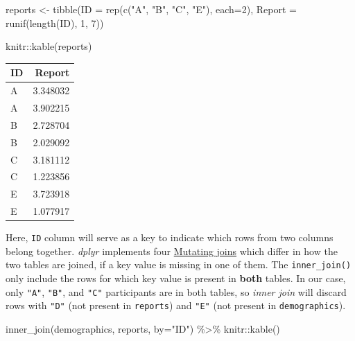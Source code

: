 \documentclass[
]{book}
\newenvironment{Shaded}{\begin{snugshade}}{\end{snugshade}}
\newcommand{\AttributeTok}[1]{\textcolor[rgb]{0.77,0.63,0.00}{#1}}
\newcommand{\DecValTok}[1]{\textcolor[rgb]{0.00,0.00,0.81}{#1}}
\newcommand{\FunctionTok}[1]{\textcolor[rgb]{0.00,0.00,0.00}{#1}}
\newcommand{\NormalTok}[1]{#1}
\newcommand{\OtherTok}[1]{\textcolor[rgb]{0.56,0.35,0.01}{#1}}
\newcommand{\SpecialCharTok}[1]{\textcolor[rgb]{0.00,0.00,0.00}{#1}}
\newcommand{\StringTok}[1]{\textcolor[rgb]{0.31,0.60,0.02}{#1}}
\begin{document}
\begin{Shaded}
\begin{Highlighting}[]
\NormalTok{reports }\OtherTok{\textless{}{-}} \FunctionTok{tibble}\NormalTok{(}\AttributeTok{ID =} \FunctionTok{rep}\NormalTok{(}\FunctionTok{c}\NormalTok{(}\StringTok{"A"}\NormalTok{, }\StringTok{"B"}\NormalTok{, }\StringTok{"C"}\NormalTok{, }\StringTok{"E"}\NormalTok{), }\AttributeTok{each=}\DecValTok{2}\NormalTok{),}
                  \AttributeTok{Report =} \FunctionTok{runif}\NormalTok{(}\FunctionTok{length}\NormalTok{(ID), }\DecValTok{1}\NormalTok{, }\DecValTok{7}\NormalTok{))}

\NormalTok{knitr}\SpecialCharTok{::}\FunctionTok{kable}\NormalTok{(reports)}
\end{Highlighting}
\end{Shaded}

\begin{tabular}{l|r}
\hline
ID & Report\\
\hline
A & 3.348032\\
\hline
A & 3.902215\\
\hline
B & 2.728704\\
\hline
B & 2.029092\\
\hline
C & 3.181112\\
\hline
C & 1.223856\\
\hline
E & 3.723918\\
\hline
E & 1.077917\\
\hline
\end{tabular}

Here, \texttt{ID} column will serve as a key to indicate which rows from two columns belong together. \emph{dplyr} implements four \href{https://dplyr.tidyverse.org/reference/mutate-joins.html}{Mutating joins} which differ in how the two tables are joined, if a key value is missing in one of them. The \texttt{inner\_join()} only include the rows for which key value is present in \textbf{both} tables. In our case, only \texttt{"A"}, \texttt{"B"}, and \texttt{"C"} participants are in both tables, so \emph{inner join} will discard rows with \texttt{"D"} (not present in \texttt{reports}) and \texttt{"E"} (not present in \texttt{demographics}).

\begin{Shaded}
\begin{Highlighting}[]
\FunctionTok{inner\_join}\NormalTok{(demographics, reports, }\AttributeTok{by=}\StringTok{"ID"}\NormalTok{) }\SpecialCharTok{\%\textgreater{}\%}
\NormalTok{  knitr}\SpecialCharTok{::}\FunctionTok{kable}\NormalTok{()}
\end{Highlighting}
\end{Shaded}
\end{document}
